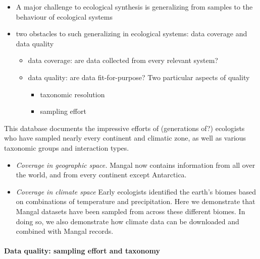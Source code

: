 \begin{itemize}
\tightlist
\item
  A major challenge to ecological synthesis is generalizing from samples
  to the behaviour of ecological systems
\item
  two obstacles to such generalizing in ecological systems: data
  coverage and data quality

  \begin{itemize}
  \tightlist
  \item
    data coverage: are data collected from every relevant system?
  \item
    data quality: are data fit-for-purpose? Two particular aspects of
    quality

    \begin{itemize}
    \tightlist
    \item
      taxonomic resolution
    \item
      sampling effort
    \end{itemize}
  \end{itemize}
\end{itemize}

This database documents the impressive efforts of (generations of?)
ecologists who have sampled nearly every continent and climatic zone, as
well as various taxonomic groups and interaction types.

\begin{itemize}
\item
  \emph{Coverage in geographic space.} Mangal now contains information
  from all over the world, and from every continent except Antarctica. 
\item
  \emph{Coverage in climate space} Early ecologists identified the
  earth's biomes based on combinations of temperature and precipitation.
  Here we demonstrate that Mangal datasets have been sampled from across
  these different biomes. In doing so, we also demonstrate how climate
  data can be downloaded and combined with Mangal records. 
\end{itemize}

\hypertarget{data-quality-sampling-effort-and-taxonomy}{%
\paragraph{Data quality: sampling effort and
taxonomy}\label{data-quality-sampling-effort-and-taxonomy}}


